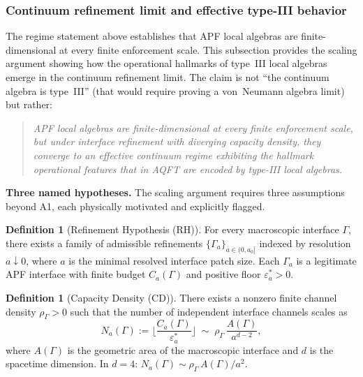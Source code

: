 \documentclass[11pt,a4paper]{article}
\theoremstyle{definition}
\newtheorem{definition}[theorem]{Definition}
\begin{document}
\subsubsection{Continuum refinement limit and effective type-III behavior}
\label{sec:refinement_limit}

The regime statement above establishes that APF local algebras are
finite-dimensional at every finite enforcement scale.  This subsection
provides the scaling argument showing how the operational hallmarks of
type~III local algebras emerge in the continuum refinement limit.  The
claim is not ``the continuum algebra is type~III'' (that would require
proving a von~Neumann algebra limit) but rather:

\begin{quote}
\itshape
APF local algebras are finite-dimensional at every finite enforcement
scale, but under interface refinement with diverging capacity density,
they converge to an effective continuum regime exhibiting the hallmark
operational features that in AQFT are encoded by type-III local
algebras.
\end{quote}

\smallskip\noindent\textbf{Three named hypotheses.}\quad
The scaling argument requires three assumptions beyond A1, each
physically motivated and explicitly flagged.

\begin{definition}[Refinement Hypothesis (RH)]\label{def:RH}
For every macroscopic interface $\Gamma$, there exists a family of
admissible refinements $\{\Gamma_a\}_{a \in (0, a_0]}$ indexed by
resolution $a \downarrow 0$, where $a$ is the minimal resolved
interface patch size.  Each $\Gamma_a$ is a legitimate APF interface
with finite budget $C_a(\Gamma)$ and positive floor
$\varepsilon^*_a > 0$.
\end{definition}

\begin{definition}[Capacity Density (CD)]\label{def:CD}
There exists a nonzero finite channel density $\rho_\Gamma > 0$
such that the number of independent interface channels scales as
\begin{equation}\label{eq:channel_scaling}
  N_a(\Gamma) := \Big\lfloor \frac{C_a(\Gamma)}{\varepsilon^*_a}
  \Big\rfloor
  \;\sim\; \rho_\Gamma\,\frac{A(\Gamma)}{a^{d-2}},
\end{equation}
where $A(\Gamma)$ is the geometric area of the macroscopic interface
and $d$ is the spacetime dimension.  In $d = 4$:
$N_a(\Gamma) \sim \rho_\Gamma\, A(\Gamma) / a^2$.
\end{definition}
\end{document}
